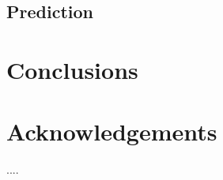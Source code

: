 \documentclass[a4paper]{article}
\begin{document}
\subsection{Prediction}



\section{Conclusions}



\section{Acknowledgements}


\newpage

\eightpt


\begin{thebibliography}{10}

 ....

\end{thebibliography}
\end{document}
